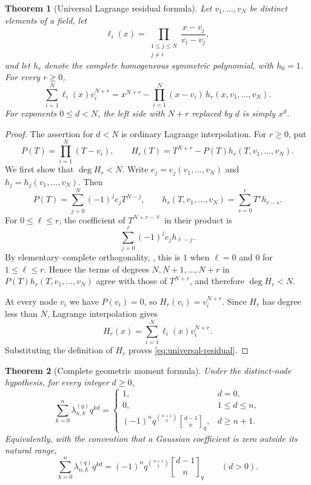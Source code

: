 \documentclass[11pt,oneside,openany]{book}
\newtheorem{theorem}{Theorem}[chapter]
\theoremstyle{definition}
\theoremstyle{remark}
\newcommand{\Qbinom}[3]{\genfrac{[}{]}{0pt}{}{#1}{#2}_{#3}}
\begin{document}
\begin{theorem}[Universal Lagrange residual formula]\label{thm:universal-lagrange-residual}
Let $v_1,\ldots,v_N$ be distinct elements of a field, let
\[
 \ell_i(x)=\prod_{\substack{1\le j\le N\\j\ne i}}
 \frac{x-v_j}{v_i-v_j},
\]
and let $h_r$ denote the complete homogeneous symmetric polynomial, with $h_0=1$.  For every $r\ge0$,
\begin{equation}\label{eq:universal-residual}
 \sum_{i=1}^{N}\ell_i(x)v_i^{N+r}
 =x^{N+r}-\prod_{i=1}^{N}(x-v_i)\,
 h_r(x,v_1,\ldots,v_N).
\end{equation}
For exponents $0\le d<N$, the left side with $N+r$ replaced by $d$ is simply $x^d$.
\end{theorem}

\begin{proof}
The assertion for $d<N$ is ordinary Lagrange interpolation.  For $r\ge0$, put
\[
 P(T)=\prod_{i=1}^{N}(T-v_i),
 \qquad
 H_r(T)=T^{N+r}-P(T)h_r(T,v_1,\ldots,v_N).
\]
We first show that $\deg H_r<N$.  Write $e_j=e_j(v_1,\ldots,v_N)$ and
$h_j=h_j(v_1,\ldots,v_N)$.  Then
\[
 P(T)=\sum_{j=0}^{N}(-1)^je_jT^{N-j},
 \qquad
 h_r(T,v_1,\ldots,v_N)=\sum_{s=0}^{r}T^s h_{r-s}.
\]
For $0\le \ell\le r$, the coefficient of $T^{N+r-\ell}$ in their product is
\[
 \sum_{j=0}^{\ell}(-1)^je_jh_{\ell-j}.
\]
By elementary--complete orthogonality, , this is $1$ when $\ell=0$ and $0$ for $1\le\ell\le r$.  Hence the terms of degrees $N,N+1,\ldots,N+r$ in $P(T)h_r(T,v_1,\ldots,v_N)$ agree with those of $T^{N+r}$, and therefore $\deg H_r<N$.

At every node $v_i$ we have $P(v_i)=0$, so
$H_r(v_i)=v_i^{N+r}$.  Since $H_r$ has degree less than $N$, Lagrange interpolation gives
\[
 H_r(x)=\sum_{i=1}^{N}\ell_i(x)v_i^{N+r}.
\]
Substituting the definition of $H_r$ proves \eqref{eq:universal-residual}.
\end{proof}

\begin{theorem}[Complete geometric moment formula]\label{thm:complete-geometric-moments}
Under the distinct-node hypothesis, for every integer $d\ge0$,
\begin{equation}\label{eq:complete-geometric-moments}
 \sum_{k=0}^{n}\lambda_{n,k}^{(q)}q^{kd}
 =
 \begin{cases}
  1,&d=0,\\
  0,&1\le d\le n,\\
  (-1)^nq^{\binom{n+1}{2}}\Qbinom{d-1}{n}{q},&d\ge n+1.
 \end{cases}
\end{equation}
Equivalently, with the convention that a Gaussian coefficient is zero outside its natural range,
\begin{equation}\label{eq:complete-geometric-moments-compact}
 \sum_{k=0}^{n}\lambda_{n,k}^{(q)}q^{kd}
 =(-1)^nq^{\binom{n+1}{2}}\Qbinom{d-1}{n}{q}
 \qquad(d>0).
\end{equation}
\end{theorem}
\end{document}
